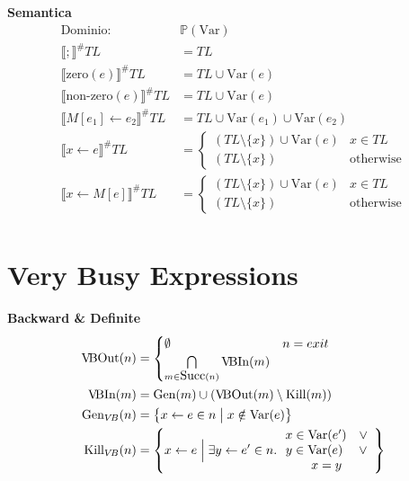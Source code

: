 \documentclass[a4paper,12pt,openany]{article}
\newcommand{\TL}{T\!L}
\newcommand{\VB}{V\!B}
\begin{document}
    \textbf{Semantica}
    \begin{align*}
    \mbox{Dominio: }& \mathbb{P}(\mbox{Var})\\
    \llbracket ; \rrbracket^\#\TL &= \TL\\
    \llbracket \mbox{zero}(e) \rrbracket^\#\TL &= \TL \cup \mbox{Var}(e)\\
    \llbracket \mbox{non-zero}(e) \rrbracket^\#\TL &= \TL \cup \mbox{Var}(e)\\
    \llbracket M[e_1]\leftarrow e_2 \rrbracket^\#\TL &= \TL \cup \mbox{Var}(e_1) \cup \mbox{Var}(e_2)\\
    \llbracket x \leftarrow e \rrbracket^\#\TL &=
    \begin{cases}
        (\TL\setminus \{x\}) \cup \mbox{Var}(e) & x\in\TL\\
        (\TL\setminus \{x\}) & \mbox{otherwise}
    \end{cases}\\
    \llbracket x\leftarrow M[e] \rrbracket^\#\TL &=
    \begin{cases}
        (\TL\setminus \{x\}) \cup \mbox{Var}(e) & x\in\TL\\
        (\TL\setminus \{x\}) & \mbox{otherwise}
    \end{cases}\\
    \end{align*}


    \section*{Very Busy Expressions}
    \textbf{Backward \& Definite}
    \begin{align*}
    \mbox{\VB Out}(n) &=
    \begin{cases}
    \emptyset & n = exit\\
    \bigcap\limits_{m\in \mbox{Succ}(n)} \mbox{\VB In}(m)
    \end{cases}\\
    \mbox{\VB In}(m) &= \mbox{Gen}(m) \cup (\mbox{\VB Out}(m) \setminus \mbox{Kill}(m))\\
    \mbox{Gen}_{\VB}(n) &= \left\{
    x\leftarrow e \in n\;\big\vert\; x \notin\mbox{Var}(e)
    \right\}\\
    \mbox{Kill}_{\VB}(n) &= \left\{
        x\leftarrow e \;\Big\vert\; \exists y\leftarrow e'\in n.\,
        \begin{array}{cc}
            x\in \mbox{Var}(e')\quad\lor\\
            y\in \mbox{Var}(e)\;\quad\lor\\
            x = y
        \end{array}
    \right\}
    \end{align*}
    
\end{document}
